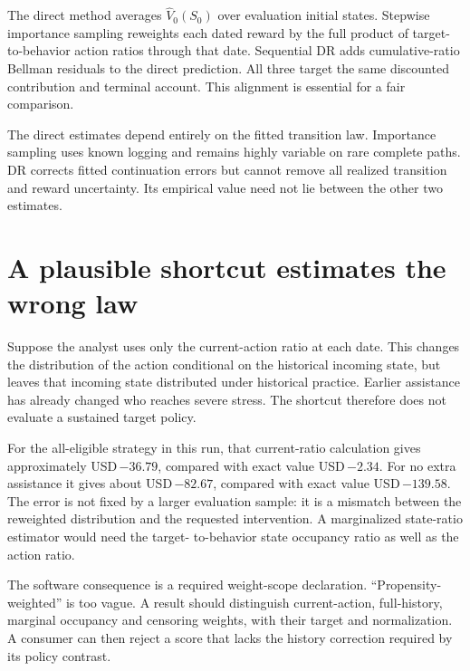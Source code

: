 The direct method averages $\widehat V_0(S_0)$ over evaluation initial
states. Stepwise importance sampling reweights each dated reward by the
full product of target-to-behavior action ratios through that date.
Sequential DR adds cumulative-ratio Bellman residuals to the direct
prediction. All three target the same discounted contribution and
terminal account. This alignment is essential for a fair comparison.

\begin{table}[htbp]\centering\small

\caption{Eight-decision fixed-policy values in dollars per original eligible
customer. Final ESS describes concentration of final trajectory weights;
it is not the independent sample size of every dated score.}
\label{tab:collections-values}
\end{table}

The direct estimates depend entirely on the fitted transition law.
Importance sampling uses known logging and remains highly variable on
rare complete paths. DR corrects fitted continuation errors but cannot
remove all realized transition and reward uncertainty. Its empirical
value need not lie between the other two estimates.

\section{A plausible shortcut estimates the wrong law}
Suppose the analyst uses only the current-action ratio at each date.
This changes the distribution of the action conditional on the historical
incoming state, but leaves that incoming state distributed under historical
practice. Earlier assistance has already changed who reaches severe
stress. The shortcut therefore does not evaluate a sustained target policy.

For the all-eligible strategy in this run, that current-ratio calculation
gives approximately USD\,$-36.79$, compared with exact value USD\,$-2.34$.
For no extra assistance it gives about USD\,$-82.67$, compared with exact
value USD\,$-139.58$. The error is not fixed by a larger evaluation sample:
it is a mismatch between the reweighted distribution and the requested
intervention. A marginalized state-ratio estimator would need the target-
to-behavior state occupancy ratio as well as the action ratio.

The software consequence is a required weight-scope declaration.
``Propensity-weighted'' is too vague. A result should distinguish
current-action, full-history, marginal occupancy and censoring weights,
with their target and normalization. A consumer can then reject a score
that lacks the history correction required by its policy contrast.


